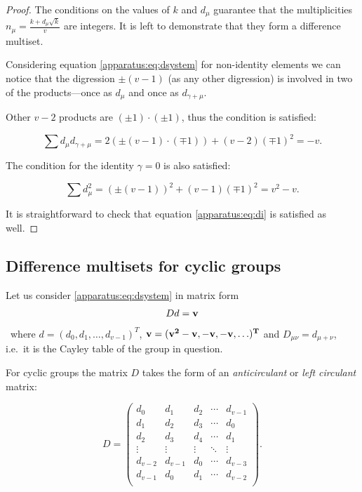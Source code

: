     \begin{proof}
        The conditions on the values of $k$ and $d_\mu$ guarantee that the multiplicities $n_\mu=\frac{k+d_\mu \sqrt k}v$ are integers. It is left to demonstrate that they form a difference multiset.
        
        Considering equation \eqref{apparatus:eq:dsystem} for non-identity elements we can notice that the digression $\pm(v-1)$ (as any other digression) is involved in two of the products---once as $d_\mu$ and once as $d_{\gamma+\mu}$.

Other $v-2$ products are $(\pm1)\cdot(\pm1)$, thus the condition is satisfied:
        
        \begin{equation}
            \sum d_\mu d_{\gamma+\mu} = 2(\pm(v-1)\cdot(\mp 1)) + (v-2)(\mp1)^2 = -v.
        \end{equation}

        The condition for the identity $\gamma=0$ is also satisfied:
        
        \begin{equation}
            \sum d_\mu^2  = \left( \pm (v-1) \right)^2 + (v-1) \left( \mp 1 \right)^2 = v^2 - v.
        \end{equation}
    
        It is straightforward to check that equation \eqref{apparatus:eq:di} is satisfied as well.
    \end{proof}

\subsection{Difference multisets for cyclic groups}
    Let us consider \eqref{apparatus:eq:dsystem} in matrix form 
    \begin{equation}
    \label{general:eq:matrix_eq}
        D d = \bf v
    \end{equation}\
    where $d = (d_0, d_1, \ldots, d_{v-1})^T$, $\bf{v} = (v^2-v, -v, -v, \ldots)^T$ and $D_{\mu\nu} = d_{\mu+\nu}$, i.e.\ it is the Cayley table of the group in question.
    
    For cyclic groups the matrix $D$ takes the form of an \emph{anticirculant} or \emph{left circulant} matrix:
    
    \begin{equation}
        \label{general:eq:anticirculant_matrix}
        D =
        \begin{pmatrix}
            d_0 & d_1 & d_2 & \cdots & d_{v-1} \\ 
            d_1 & d_2 & d_3 & \cdots & d_0 \\
            d_2 & d_3 & d_4 & \cdots & d_1 \\
            \vdots & \vdots & \vdots & \ddots & \vdots \\
            d_{v-2} & d_{v-1} & d_0 & \cdots & d_{v-3} \\
            d_{v-1} & d_0 & d_1 & \cdots & d_{v-2} \\
        \end{pmatrix}.
    \end{equation}
    
